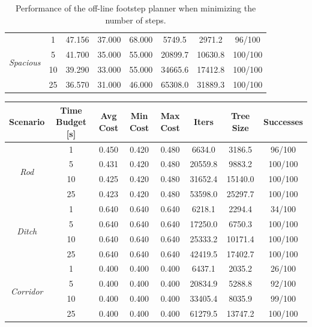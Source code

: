 \begin{table}
\begin{tabular}{*{8}{c}}
        \hline   
        \multirow{4}{*}{\textit{Spacious}} & 1 & 47.156 & 37.000 & 68.000 & 5749.5 & 2971.2 & 96/100 \\
         & 5 & 41.700 & 35.000 & 55.000 & 20899.7 & 10630.8 & 100/100 \\
         & 10 & 39.290 & 33.000 & 55.000 & 34665.6 & 17412.8 & 100/100 \\
         & 25 & 36.570 & 31.000 & 46.000 & 65308.0 & 31889.3 & 100/100 \\   
    
    \end{tabular}
    \caption{Performance of the off-line footstep planner when minimizing the number of steps.}
    \label{tab:benchmark:off-line:steps}
\end{table}

\begin{table}
    \centering
    \begin{tabular}{*{8}{c}}
         Scenario & Time Budget [s] & Avg Cost & Min Cost & Max Cost & Iters & Tree Size & Successes \\
        \hline
        \multirow{4}{*}{\textit{Rod}} & 1 & 0.450 & 0.420 & 0.480 & 6634.0 & 3186.5 & 96/100 \\
         & 5 & 0.431 & 0.420 & 0.480 & 20559.8 & 9883.2 & 100/100 \\
         & 10 & 0.425 & 0.420 & 0.480 & 31652.4 & 15140.0 & 100/100 \\
         & 25 & 0.423 & 0.420 & 0.480 & 53598.0 & 25297.7 & 100/100 \\
        
        \hline                                                          
        \multirow{4}{*}{\textit{Ditch}} & 1 & 0.640 & 0.640 & 0.640 & 6218.1 & 2294.4 & 34/100 \\
         & 5 & 0.640 & 0.640 & 0.640 & 17250.0 & 6750.3 & 100/100 \\
         & 10 & 0.640 & 0.640 & 0.640 & 25333.2 & 10171.4 & 100/100 \\
         & 25 & 0.640 & 0.640 & 0.640 & 42419.5 & 17402.7 & 100/100 \\  
        
        \hline                                                            
        \multirow{4}{*}{\textit{Corridor}} & 1 & 0.400 & 0.400 & 0.400 & 6437.1 & 2035.2 & 26/100 \\
         & 5 & 0.400 & 0.400 & 0.400 & 20834.9 & 5288.8 & 92/100 \\
         & 10 & 0.400 & 0.400 & 0.400 & 33405.4 & 8035.9 & 99/100 \\
         & 25 & 0.400 & 0.400 & 0.400 & 61279.5 & 13747.2 & 100/100 \\    


\end{tabular}
\end{table}
